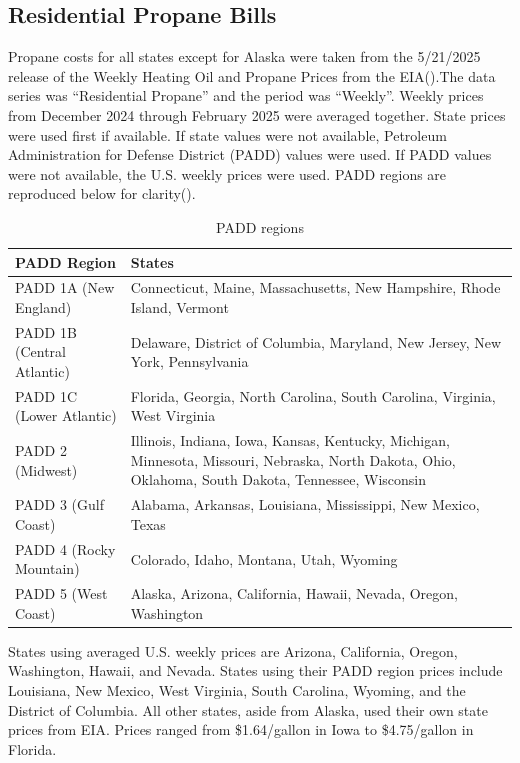 \subsection{Residential Propane Bills}
Propane costs for all states except for Alaska were taken from the 5/21/2025 release of the Weekly Heating Oil and Propane Prices from the EIA(\cite{EIA_propane_prices}).The data series was “Residential Propane” and the period was “Weekly”. Weekly prices from December 2024 through February 2025 were averaged together. State prices were used first if available. If state values were not available, Petroleum Administration for Defense District (PADD) values were used. If PADD values were not available, the U.S. weekly prices were used. PADD regions are reproduced below for clarity(\cite{EIA_padd_definitions}).

\begin{longtable}{ |p{3cm}|p{8cm}| }
\caption{PADD regions} \label{table:PADD_regions} \\
\toprule\noalign{}
\textbf{PADD Region} & \textbf{States} \\
\midrule\noalign{}
\endhead
\bottomrule\noalign{}
        PADD 1A (New England) & Connecticut, Maine, Massachusetts, New Hampshire, Rhode Island, Vermont \\ \hline
        PADD 1B (Central Atlantic) & Delaware, District of Columbia, Maryland, New Jersey, New York, Pennsylvania \\ \hline
        PADD 1C (Lower Atlantic) & Florida, Georgia, North Carolina, South Carolina, Virginia, West Virginia \\ \hline
        PADD 2 (Midwest) & Illinois, Indiana, Iowa, Kansas, Kentucky, Michigan, Minnesota, Missouri, Nebraska, North Dakota, Ohio, Oklahoma, South Dakota, Tennessee, Wisconsin \\ \hline
        PADD 3 (Gulf Coast) & Alabama, Arkansas, Louisiana, Mississippi, New Mexico, Texas \\ \hline
        PADD 4 (Rocky Mountain) & Colorado, Idaho, Montana, Utah, Wyoming \\ \hline
        PADD 5 (West Coast) & Alaska, Arizona, California, Hawaii, Nevada, Oregon, Washington \\ \hline
\end{longtable}

States using averaged U.S. weekly prices are Arizona, California, Oregon, Washington, Hawaii, and Nevada. States using their PADD region prices include Louisiana, New Mexico, West Virginia, South Carolina, Wyoming, and the District of Columbia. All other states, aside from Alaska, used their own state prices from EIA. Prices ranged from \$1.64/gallon in Iowa to \$4.75/gallon in Florida.

